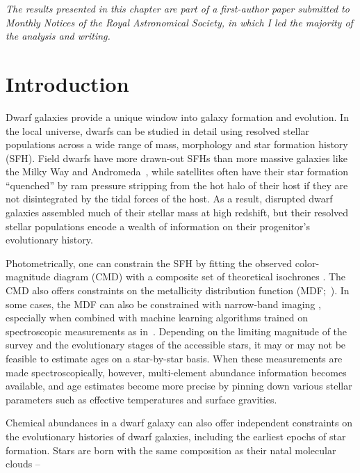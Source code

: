 
\begin{center}
\textit{
	The results presented in this chapter are part of a first-author paper
	submitted to Monthly Notices of the Royal Astronomical Society, in which I
	led the majority of the analysis and writing.
}
\end{center}

\section{Introduction}
\label{dga:sec:intro}
Dwarf galaxies provide a unique window into galaxy formation and evolution.
In the local universe, dwarfs can be studied in detail using resolved stellar
populations across a wide range of mass, morphology and star formation history
(SFH).
Field dwarfs have more drawn-out SFHs than more massive galaxies like the Milky
Way and Andromeda~\citep[e.g.,][]{Behroozi2019, GarrisonKimmel2019}, while
satellites often have their star formation ``quenched'' by ram pressure
stripping from the hot halo of their host
\citep*[see discussion in, e.g.,][]{Steyrleithner2020} if they are not
disintegrated by the tidal forces of the host.
As a result, disrupted dwarf galaxies assembled much of their stellar mass at
high redshift, but their resolved stellar populations encode a wealth of
information on their progenitor's evolutionary history.
\par
Photometrically, one can constrain the SFH by fitting the observed
color-magnitude diagram (CMD) with a composite set of theoretical isochrones
\citep[e.g.,][]{Dolphin2002, Weisz2014b}.
The CMD also offers constraints on the metallicity distribution function
(MDF;~\citealp*[e.g.,][]{Lianou2011}).
In some cases, the MDF can also be constrained with narrow-band imaging
\citep{Fu2022}, especially when combined with machine learning algorithms
trained on spectroscopic measurements as in~\citet{Whitten2021}.
Depending on the limiting magnitude of the survey and the evolutionary stages
of the accessible stars, it may or may not be feasible to estimate ages on a
star-by-star basis.
When these measurements are made spectroscopically, however, multi-element
abundance information becomes available, and age estimates become more precise
by pinning down various stellar parameters such as effective temperatures and
surface gravities.
\par
Chemical abundances in a dwarf galaxy can also offer independent constraints
on the evolutionary histories of dwarf galaxies, including the earliest epochs
of star formation.
Stars are born with the same composition as their natal molecular clouds --
